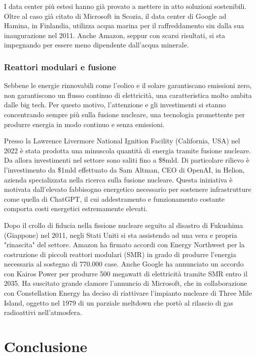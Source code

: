 \documentclass[12pt,a4paper,oneside]{book}
\begin{document}
I data center più estesi hanno già provato a mettere in atto soluzioni sostenibili. Oltre al caso già citato di Microsoft in Scozia, il data center di Google ad Hamina, in Finlandia, utilizza acqua marina per il raffreddamento sin dalla sua inaugurazione nel 2011. Anche Amazon, seppur con scarsi risultati, si sta impegnando per essere meno dipendente dall'acqua minerale.

\subsection{Reattori modulari e fusione}
Sebbene le energie rinnovabili come l'eolico e il solare garantiscano emissioni zero, non garantiscono un flusso continuo di elettricità, una caratteristica molto ambita dalle big tech. Per questo motivo, l'attenzione e gli investimenti si stanno concentrando sempre più sulla fusione nucleare, una tecnologia promettente per produrre energia in modo continuo e senza emissioni.

Presso la Lawrence Livermore National Ignition Facility (California, USA) nel 2022 è stata prodotta una minuscola quantità di energia tramite fusione nucleare. Da allora investimenti nel settore sono saliti fino a \$8mld. Di particolare rilievo è l'investimento da \$1mld effettuato da Sam Altman, CEO di OpenAI, in Helion, azienda specializzata nella ricerca sulla fusione nucleare. Questa iniziativa è motivata dall'elevato fabbisogno energetico necessario per sostenere infrastrutture come quella di ChatGPT, il cui addestramento e funzionamento costante comporta costi energetici estremamente elevati.

Dopo il crollo di fiducia nella fissione nucleare seguito al disastro di Fukushima (Giappone) nel 2011, negli Stati Uniti si sta assistendo ad una vera e propria "rinascita" del settore. Amazon ha firmato accordi con Energy Northwest per la costruzione di piccoli reattori modulari (SMR) in grado di produrre l'energia necessaria al sostegno di 770.000 case. Anche Google ha annunciato un accordo con Kairos Power per produrre 500 megawatt di elettricità tramite SMR entro il 2035.
Ha suscitato grande clamore l'annuncio di Microsoft, che in collaborazione con Constellation Energy ha deciso di riattivare l'impianto nucleare di Three Mile Island, oggetto nel 1979 di un parziale meltdown che portò al rilascio di gas radioattivi nell'atmosfera.

\chapter{Conclusione}
\end{document}
